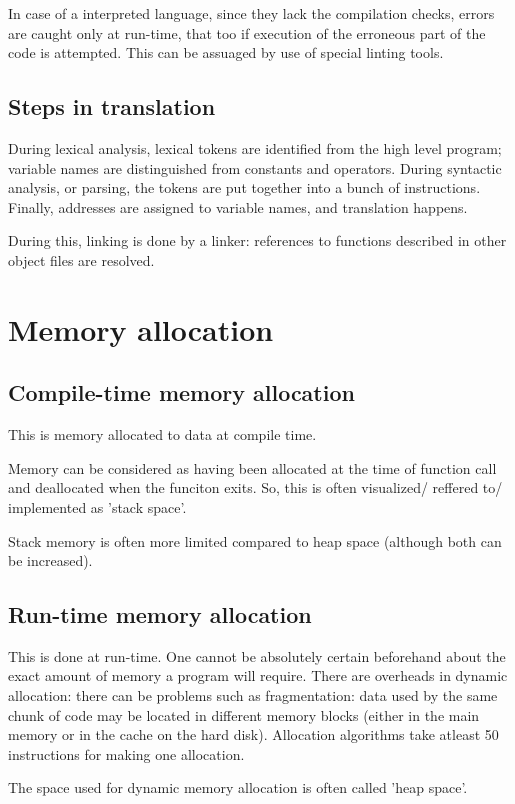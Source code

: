 \documentclass[oneside, article]{memoir}
\begin{document}
In case of a interpreted language, since they lack the compilation checks, errors are caught only at run-time, that too if execution of the erroneous part of the code is attempted. This can be assuaged by use of special linting tools.

\subsection{Steps in translation}
During lexical analysis, lexical tokens are identified from the high level program; variable names are distinguished from constants and operators. During syntactic analysis, or parsing, the tokens are put together into a bunch of instructions. Finally, addresses are assigned to variable names, and translation happens.

During this, linking is done by a linker: references to functions described in other object files are resolved.

\section{Memory allocation}
\subsection{Compile-time memory allocation}
This is memory allocated to data at compile time.

Memory can be considered as having been allocated at the time of function call and deallocated when the funciton exits. So, this is often visualized/ reffered to/ implemented as 'stack space'.

Stack memory is often more limited compared to heap space (although both can be increased).

\subsection{Run-time memory allocation}
This is done at run-time. One cannot be absolutely certain beforehand about the exact amount of memory a program will require. There are overheads in dynamic allocation: there can be problems such as fragmentation: data used by the same chunk of code may be located in different memory blocks (either in the main memory or in the cache on the hard disk). Allocation algorithms take atleast 50 instructions for making one allocation.

The space used for dynamic memory allocation is often called 'heap space'.
\end{document}

